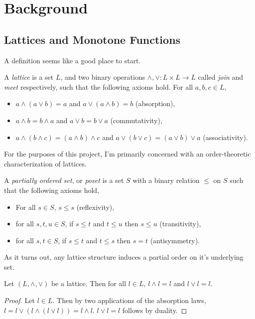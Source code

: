 \chapter{Background}

\section{Lattices and Monotone Functions}
A definition seems like a good place to start.
\begin{definition}[Lattice]\label{latedef}
  A \emph{lattice} is a set $L$, and two binary operations $\wedge, \vee : L \times L \to L$ called \emph{join} and \emph{meet} respectively,
  such that the following axioms hold. For all $a, b, c \in L$,
  \begin{itemize}
    \item $a \wedge (a \vee b) = a$ and $a \vee (a \wedge b) = b$ (absorption),
    \item $a \wedge b = b \wedge a$ and $a \vee b = b \vee a$ (commutativity),
    \item $a \wedge (b \wedge c) = (a \wedge b) \wedge c$ and $a \vee (b \vee c) = (a \vee b) \vee a$ (associativity).
  \end{itemize}
\end{definition}
For the purposes of this project, I'm primarily concerned with an order-theoretic characterization of lattices. 
\begin{definition}[Poset]\label{posetdef}
  A \emph{partially ordered set}, or \emph{poset} is a set $S$ with a binary relation $\leq$ on $S$ such that the following axioms hold,
  \begin{itemize}
    \item For all $s \in S$, $s \leq s$ (reflexivity),
    \item for all $s, t, u \in S$, if $s \leq t$ and $t \leq u$ then $s \leq u$ (transitivity),
    \item for all $s, t \in S$, if $s \leq t$ and $t \leq s$ then $s = t$ (antisymmetry).
  \end{itemize}
\end{definition}
As it turns out, any lattice structure induces a partial order on it's underlying set.
\begin{lemma}\label{joinMeetIdempotent}
  Let $(L, \wedge, \vee)$ be a lattice. Then for all $l \in L$, $l \wedge l = l$ and $l \vee l = l$.
\end{lemma}
\begin{proof}
  Let $l \in L$. Then by two applications of the absorption laws, $l = l \vee (l \wedge (l \vee l)) = l \wedge l$. $l \vee l = l$ follows
  by duality.
\end{proof}
